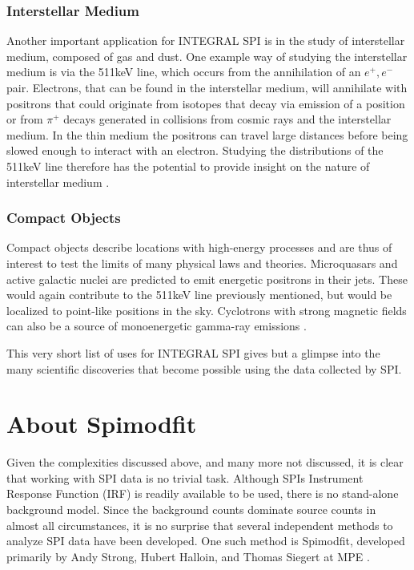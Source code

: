\documentclass{report}
\begin{document}
\subsubsection*{Interstellar Medium}

Another important application for INTEGRAL SPI is in the study of interstellar medium, composed of gas and dust. One example way of studying the interstellar medium is via the 511keV line, which occurs from the annihilation of an $e^+,e^-$ pair. Electrons, that can be found in the interstellar medium, will annihilate with positrons that could originate from isotopes that decay via emission of a position or from $\pi^+$ decays generated in collisions from cosmic rays and the interstellar medium. In the thin medium the positrons can travel large distances before being slowed enough to interact with an electron. Studying the distributions of the 511keV line therefore has the potential to provide insight on the nature of interstellar medium \cite{Wunderer2002ImagingWT}.

\subsubsection*{Compact Objects}
Compact objects describe locations with high-energy processes and are thus of interest to test the limits of many physical laws and theories. Microquasars and active galactic nuclei are predicted to emit energetic positrons in their jets. These would again contribute to the 511keV line previously mentioned, but would be localized to point-like positions in the sky. Cyclotrons with strong magnetic fields can also be a source of monoenergetic gamma-ray emissions \cite{Wunderer2002ImagingWT}. 


This very short list of uses for INTEGRAL SPI gives but a glimpse into the many scientific discoveries that become possible using the data collected by SPI.

\section{About Spimodfit} \label{about smf}



Given the complexities discussed above, and many more not discussed, it is clear that working with SPI data is no trivial task. Although SPIs Instrument Response Function (IRF) is readily available to be used, there is no stand-alone background model. Since the background counts dominate source counts in almost all circumstances, it is no surprise that several independent methods to analyze SPI data have been developed. One such method is Spimodfit, developed primarily by Andy Strong, Hubert Halloin, and Thomas Siegert at MPE \cite{refId1} \cite{SMF_Cookbook}.
\end{document}
